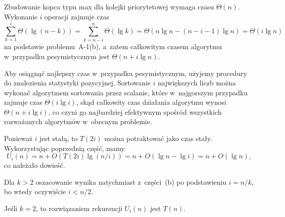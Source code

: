 \subproblem %
Zbudowanie kopca typu max dla kolejki priorytetowej wymaga czasu $\Theta(n)$. Wykonanie $i$ operacji  zajmuje czas
\[
	\sum_{k=1}^i\Theta(\lg(n-k)) = \sum_{k=n-i}^n\Theta(\lg k) = \Theta(n\lg n-(n-i-1)\lg n) = \Theta(i\lg n)
\]
na podstawie problemu~A-1(b), a~zatem całkowitym czasem algorytmu w~przypadku pesymistycznym jest $\Theta(n+i\lg n)$.

\subproblem %
Aby osiągnąć najlepszy czas w~przypadku pesymistycznym, użyjemy procedury  do znalezienia  statystyki pozycyjnej. Sortowanie $i$ największych liczb można wykonać algorytmem sortowania przez scalanie, które w~najgorszym przypadku zajmuje czas $\Theta(i\lg i)$, skąd całkowity czas działania algorytmu wynosi $\Theta(n+i\lg i)$, co czyni go najbardziej efektywnym spośród wszystkich rozważanych algorytmów w~obecnym problemie.


\subproblem %
\subproblem %
\subproblem %
\subproblem %
\subproblem %


\subproblem %
\subproblem %

\subproblem %
Ponieważ $i$ jest stałą, to $T(2i)$ można potraktować jako czas stały. Wykorzystując poprzednią część, mamy
\[
	U_i(n) = n+O(T(2i)\lg(n/i)) = n+O(\lg n-\lg i) = n+O(\lg n),
\]
co należało dowieść.

\subproblem %
Dla $k>2$ oszacowanie wynika natychmiast z~części~(b) po podstawieniu $i=n/k$, bo wtedy oczywiście $i<n/2$.

Jeśli $k=2$, to rozwiązaniem rekurencji $U_i(n)$ jest $T(n)$.

\endinput
